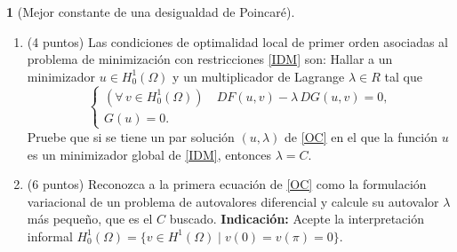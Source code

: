 \documentclass[10pt,a4paper]{report}
\newcommand{\Real}{R}
\theoremstyle{definition}
\newtheorem{problem}{\color{azul}{Problema}}
\renewcommand{\theproblem}{\Alph{problem}}
\numberwithin{equation}{problem}
\begin{document}
\begin{problem}[Mejor constante de una desigualdad de Poincaré]
\begin{enumerate}[label=\textbf{\theproblem.\Roman{*}.},ref=\theproblem.\Roman{*},parsep=1ex]
			Obtenga fórmulas explícitas para $DF$ y $DG$.
			\item\label{q:optimalityConditions} (4 puntos) Las condiciones de optimalidad local de primer orden asociadas al problema de minimización con restricciones \eqref{IDM} son:
			Hallar a un minimizador $u \in H^1_0(\Omega)$ y un multiplicador de Lagrange $\lambda \in \Real$ tal que
			\begin{equation}\label{OC}\tag{$\star$}
				\left\{
				\begin{array}{c}
					(\forall\,v\in H^1_0(\Omega)) \quad DF(u,v) - \lambda \, DG(u,v) = 0,\\
					G(u) = 0.
				\end{array}
				\right.
			\end{equation}
			Pruebe que si se tiene un par solución $(u,\lambda)$ de \eqref{OC} en el que la función $u$ es un minimizador global de \eqref{IDM}, entonces $\lambda = C$.
			\item\label{q:computeMinimizer} (6 puntos) Reconozca a la primera ecuación de \eqref{OC} como la formulación variacional de un problema de autovalores diferencial y calcule su autovalor $\lambda$ más pequeño, que es el $C$ buscado.
			\textbf{Indicación:} Acepte la interpretación informal $H^1_0(\Omega) = \{ v \in H^1(\Omega) \mid v(0) = v(\pi) = 0 \}$.
		\end{enumerate}
	\end{problem}
\end{document}
